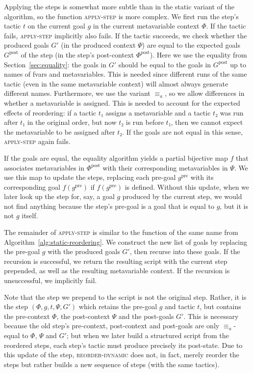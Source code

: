 \documentclass[sigplan,10pt,anonymous,review]{acmart}
\newcommand{\pre}{\mathrm{pre}}
\newcommand{\post}{\mathrm{post}}
\newcommand{\step}[5]{\ensuremath{(#1,\allowbreak #2,\allowbreak #3,\allowbreak #4,\allowbreak #5)}}
\begin{document}
Applying the steps is somewhat more subtle than in the static variant of the algorithm, so the function \textsc{apply-step} is more complex.
We first run the step's tactic $t$ on the current goal $g$ in the current metavariable context $Φ$.
If the tactic fails, \textsc{apply-step} implicitly also fails.
If the tactic succeeds, we check whether the produced goals $G'$ (in the produced context $Ψ$) are equal to the expected goals $G^{\post}$ of the step (in the step's post-context $Φ^{\post}$).
Here we use the equality from Section~\ref{sec:equality}: the goals in $G'$ should be equal to the goals in $G^{\post}$ up to names of fvars and metavariables.
This is needed since different runs of the same tactic (even in the same metavariable context) will almost always generate different names.
Furthermore, we use the variant $≡_{a}$, so we allow differences in whether a metavariable is assigned.
This is needed to account for the expected effects of reordering: if a tactic $t₁$ assigns a metavariable and a tactic $t₂$ was run after $t₁$ in the original order, but now $t₂$ is run before $t₁$, then we cannot expect the metavariable to be assigned after $t₂$.
If the goals are not equal in this sense, \textsc{apply-step} again fails.

If the goals are equal, the equality algorithm yields a partial bijective map $f$ that associates metavariables in $Φ^{\post}$ with their corresponding metavariables in $Ψ$.
We use this map to update the steps, replacing each pre-goal $g^{\pre}$ with its corresponding goal $f(g^{\pre})$ if $f(g^{\pre})$ is defined.
Without this update, when we later look up the step for, say, a goal $g$ produced by the current step, we would not find anything because the step's pre-goal is a goal that is equal to $g$, but it is not $g$ itself.

The remainder of \textsc{apply-step} is similar to the function of the same name from Algorithm~\ref{alg:static-reordering}.
We construct the new list of goals by replacing the pre-goal $g$ with the produced goals $G'$, then recurse into these goals.
If the recursion is successful, we return the resulting script with the current step prepended, as well as the resulting metavariable context.
If the recursion is unsuccessful, we implicitly fail.

Note that the step we prepend to the script is not the original step.
Rather, it is the step $\step{Φ}{g}{t}{Ψ}{G'}$ which retains the pre-goal $g$ and tactic $t$, but contains the pre-context $Φ$, the post-context $Ψ$ and the post-goals $G'$.
This is necessary because the old step's pre-context, post-context and post-goals are only $≡_{a}$-equal to $Φ$, $Ψ$ and $G'$; but when we later build a structured script from the reordered steps, each step's tactic must produce precisely its post-state.
Due to this update of the step, \textsc{reorder-dynamic} does not, in fact, merely reorder the steps but rather builds a new sequence of steps (with the same tactics).
\end{document}
